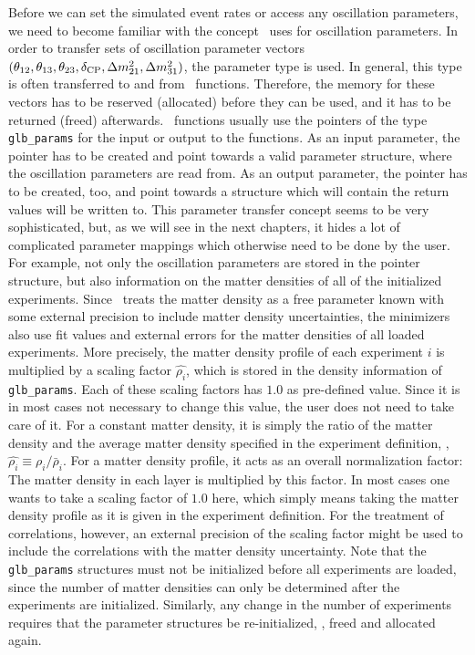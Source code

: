 Before we can set the simulated event rates or access any oscillation
parameters, we need to become familiar with the concept \GLOBES\ uses
for oscillation parameters. In order to transfer sets of oscillation
parameter vectors $(\theta_{12}, \theta_{13}, \theta_{23}, \delta_{\mathrm{CP}}, \Delta m_{21}^2, \Delta m_{31}^2)$, the parameter type  is used. In general,
 this type is often
transferred to and from \GLOBES\ functions. Therefore, the memory 
for these vectors has to be reserved (allocated) before they can be used, 
and it has
to be returned (freed) afterwards. \GLOBES\ functions usually use the pointers
of the type {\tt glb\_params} for the input or output to the functions. As
an input parameter, the pointer has to be created and point towards a valid
parameter structure, where the oscillation parameters are read from. As
an output parameter, the pointer has to be created, too, and point towards
a structure which will contain the return values will be written to.
This parameter transfer concept seems to be very sophisticated, but, as we
will see in the next chapters, it hides a lot of complicated parameter 
mappings which otherwise need to be done by the user. For example, not
only the oscillation parameters are stored in the pointer structure, but also information on the matter
densities of all of the initialized experiments. Since \GLOBES\ treats
the matter density as a free parameter known with some external precision
to include matter density uncertainties,
the minimizers also use fit values and external errors for the matter
densities of all loaded experiments. More precisely, the matter density
profile of each experiment $i$ is multiplied by a scaling factor
$\hat{\rho_i}$, 
which is stored in the density information of {\tt glb\_params}. 
Each of
these scaling factors has $1.0$ as pre-defined value. Since it
is in most cases not necessary to change this value, the user does
not need to take care of it. For a constant matter density, it is simply the ratio of the matter density and the average matter density specified in the experiment definition, \ie , $\hat{\rho_i} \equiv \rho_i/\bar{\rho}_i$. For a matter density profile, it acts as an overall normalization factor: The matter density in each layer is multiplied by this factor. In most cases one wants to take a scaling factor of $1.0$ here, which simply means taking the matter density profile as it is given in the experiment definition. For the treatment of correlations, however,
an external precision of the scaling factor might be used to include the
correlations with the matter density uncertainty.
Note that the {\tt glb\_params}
structures must not be initialized before all experiments are loaded,
since the number of matter densities can only be determined after the
experiments are initialized. 
Similarly, any change in the number of experiments requires that the
parameter structures be re-initialized, \ie, freed and allocated again.

